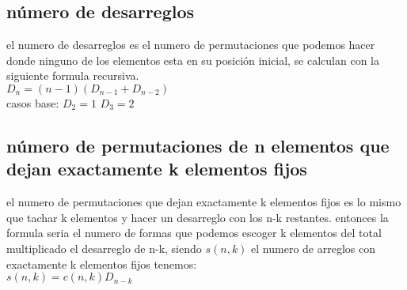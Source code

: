 \subsection{número de desarreglos}
el numero de desarreglos es el numero de permutaciones que podemos hacer donde ninguno de los elementos esta en su posición inicial, se calculan con la siguiente formula recursiva.\\
$D_{n}=(n-1)(D_{n-1}+D_{n-2})$\\
casos base:
$D_{2}=1$ $D_{3}=2$
\subsection{número de permutaciones de n elementos que dejan exactamente k elementos fijos}
el numero de permutaciones que dejan exactamente k elementos fijos es lo mismo que tachar k elementos y hacer un desarreglo con los n-k restantes. entonces la formula seria el numero de formas que podemos escoger k elementos del total multiplicado el desarreglo de n-k, siendo $s(n,k)$ el numero de arreglos con exactamente k elementos fijos tenemos:\\
$s(n,k)=c(n,k)D_{n-k}$
